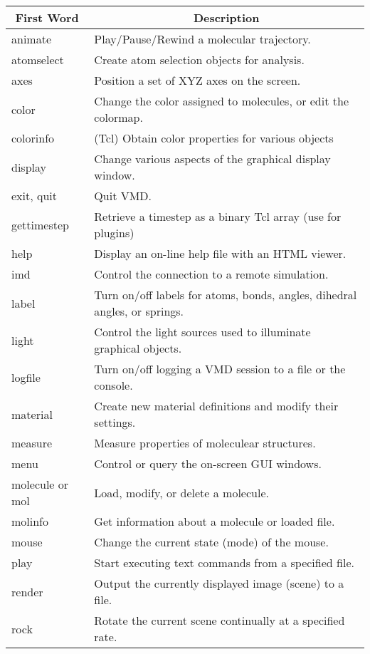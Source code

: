 \begin{table}[htp]
  \begin{tabular}{|l|l|} \hline
    \multicolumn{1}{|c}{First Word} &
	\multicolumn{1}{|c|}{Description} \\ \hline\hline
    animate	& Play/Pause/Rewind a molecular trajectory. \\
    atomselect  & Create atom selection objects for analysis. \\
    axes	& Position a set of XYZ axes on the screen. \\
    color	& Change the color assigned to molecules,
			or edit the colormap. \\
    colorinfo	& (Tcl) Obtain color properties for various objects \\
    display	& Change various aspects of the graphical display window. \\
    exit, quit	& Quit VMD. \\
    gettimestep & Retrieve a timestep as a binary Tcl array (use for plugins) \\
    help	& Display an on-line help file with an HTML viewer. \\
    imd         & Control the connection to a remote simulation. \\
    label	& Turn on/off labels for atoms, bonds, angles,
    dihedral angles, or springs. \\
    light	& Control the light sources used to illuminate
			graphical objects. \\
    logfile	& Turn on/off logging a VMD session to a file or the console. \\
    material    & Create new material definitions and modify their settings. \\
    measure     & Measure properties of moleculear structures. \\
    menu	& Control or query the on-screen GUI windows. \\
    molecule or mol	& Load, modify, or delete a molecule. \\
    molinfo     & Get information about a molecule or loaded file. \\
    mouse	& Change the current state (mode) of the mouse. \\
    play 	& Start executing text commands from a specified file. \\
    render	& Output the currently displayed image (scene) to a file. \\
    rock	& Rotate the current scene continually at a specified rate. \\

\end{tabular}
\end{table}
